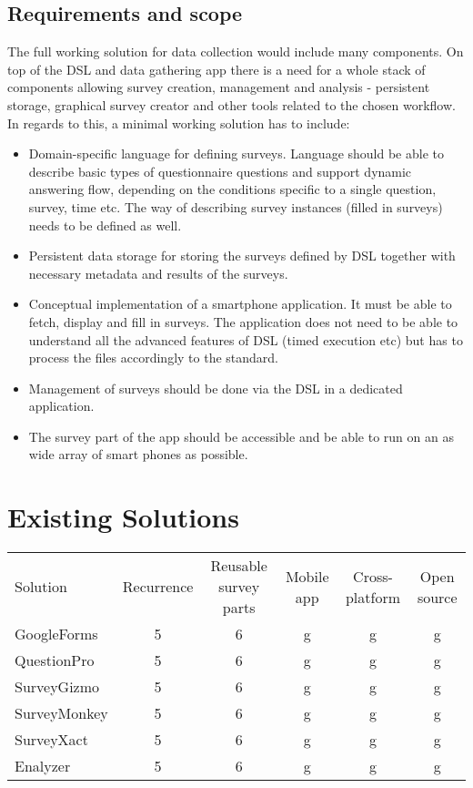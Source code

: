 \subsection{Requirements and scope}
The full working solution for data collection would include many components. On top of the DSL and data gathering app there is a need for a whole stack of components allowing survey creation, management and analysis - persistent storage, graphical survey creator and other tools related to the chosen workflow. In regards to this, a minimal working solution has to include:
\begin{itemize}
\item Domain-specific language for defining surveys. Language should be able to describe basic types of questionnaire questions and support dynamic answering flow, depending on the conditions specific to a single question, survey, time etc. The way of describing survey instances (filled in surveys) needs to be defined as well.
\item Persistent data storage for storing the surveys defined by DSL together with necessary metadata and results of the surveys.
\item Conceptual implementation of a smartphone application. It must be able to fetch, display and fill in surveys. The application does not need to be able to understand all the advanced features of DSL (timed execution etc) but has to process the files accordingly to the standard.
\item Management of surveys should be done via the DSL in a dedicated application.
\item The survey part of the app should be accessible and be able to run on an as wide array of smart phones as possible.
\end{itemize}

\section{Existing Solutions}
\label{sec:existingsolutions}

\begin{tabular}{l | c | c | c | c | c}
  Solution & Recurrence & Reusable survey parts & Mobile app & Cross-platform & Open source\\
  GoogleForms & 5 & 6 & g & g & g\\
  QuestionPro & 5 & 6 & g & g & g\\
  SurveyGizmo & 5 & 6 & g & g & g\\
  SurveyMonkey & 5 & 6 & g & g & g\\
  SurveyXact & 5 & 6 & g & g & g\\
  Enalyzer & 5 & 6 & g & g & g\\
\end{tabular}